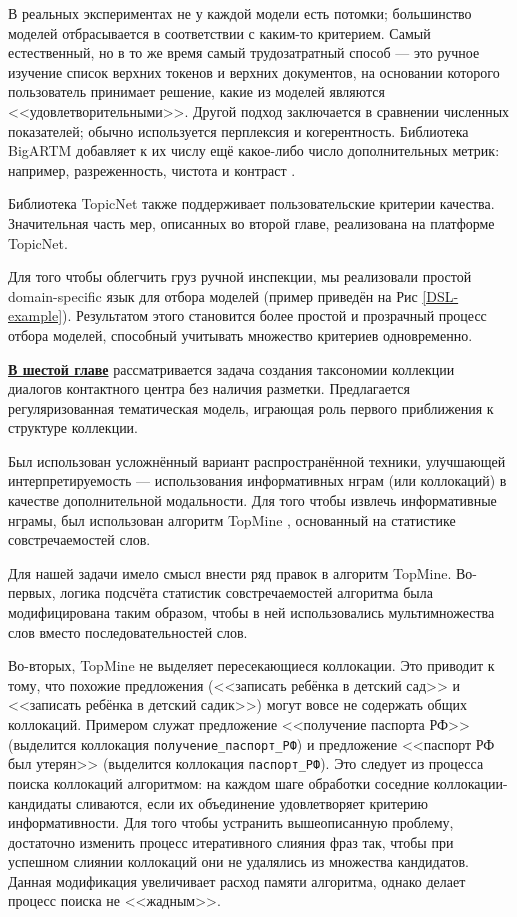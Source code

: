 В реальных экспериментах не у каждой модели есть потомки; большинство моделей отбрасывается в соответствии с каким-то критерием. Самый естественный, но в то же время самый трудозатратный способ --- это ручное изучение список верхних токенов и верхних документов, на основании которого пользователь принимает решение, какие из моделей являются <<удовлетворительными>>. Другой подход заключается в сравнении численных показателей; обычно используется перплексия и когерентность. Библиотека \mbox{BigARTM} добавляет к их числу ещё какое-либо число дополнительных метрик: например, разреженность, чистота и контраст \cite{voron15mlj}.

Библиотека TopicNet также поддерживает пользовательские критерии качества. Значительная часть мер, описанных во второй главе, реализована на платформе TopicNet.  

Для того чтобы облегчить груз ручной инспекции, мы реализовали простой domain-specific язык для отбора моделей (пример приведён на Рис \ref{DSL-example}). Результатом этого становится более простой и прозрачный процесс отбора моделей, способный учитывать множество критериев одновременно.  

\underline{\textbf{В шестой главе}} рассматривается задача создания таксономии коллекции диалогов контактного центра без наличия разметки. Предлагается регуляризованная тематическая модель, играющая роль первого приближения к структуре коллекции.

Был использован усложнённый вариант распространённой техники, улучшающей интерпретируемость --- использования информативных нграм (или коллокаций) в качестве дополнительной модальности. Для того чтобы извлечь информативные нграмы, был использован алгоритм TopMine \cite{topmine}, основанный на статистике совстречаемостей слов.

Для нашей задачи имело смысл внести ряд правок в алгоритм TopMine. Во-первых, логика подсчёта статистик совстречаемостей алгоритма была модифицирована таким образом, чтобы в ней использовались мультимножества слов вместо последовательностей слов. 

Во-вторых, TopMine не выделяет пересекающиеся коллокации. Это приводит к тому, что похожие предложения (<<записать ребёнка в детский сад>> и <<записать ребёнка в детский садик>>) могут вовсе не содержать общих коллокаций. Примером служат предложение <<получение паспорта РФ>> (выделится коллокация \texttt{получение\_паспорт\_РФ}) и предложение <<паспорт РФ был утерян>> (выделится коллокация \texttt{паспорт\_РФ}). Это следует из процесса поиска коллокаций алгоритмом: на каждом шаге обработки соседние коллокации-кандидаты сливаются, если их объединение удовлетворяет критерию информативности. Для того чтобы устранить вышеописанную проблему, достаточно изменить процесс итеративного слияния фраз так, чтобы при успешном слиянии коллокаций они не удалялись из множества кандидатов. Данная модификация увеличивает расход памяти алгоритма, однако делает процесс поиска не <<жадным>>.

